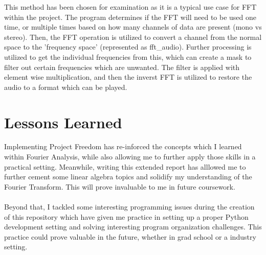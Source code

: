 \documentclass[notitlepage]{article}
\begin{document}
This method has been chosen for examination as it is a typical use case for FFT within
the project. The program determines if the FFT will need to be used one time, or multiple
times based on how many channels of data are present (mono vs stereo). Then, the FFT
operation is utilized to convert a channel from the normal space to the 'frequency space'
(represented as fft\_audio). Further processing is utilized to get the individual frequencies
from this, which can create a mask to filter out certain frequencies which are unwanted.
The filter is applied with element wise multiplication, and then the inverst FFT is utilized
to restore the audio to a format which can be played.

\section{Lessons Learned}

Implementing Project Freedom has re-inforced the concepts which I learned within Fourier Analysis,
while also allowing me to further apply those skills in a practical setting. Meanwhile, writing
this extended report has alllowed me to further cement some linear algebra topics and solidify
my understanding of the Fourier Transform. This will prove invaluable to me in future coursework.
\\\\
Beyond that, I tackled some interesting programming issues during the creation of this repository
which have given me practice in setting up a proper Python development setting and solving interesting
program organization challenges. This practice could prove valuable in the future, whether in grad
school or a industry setting.
\end{document}
